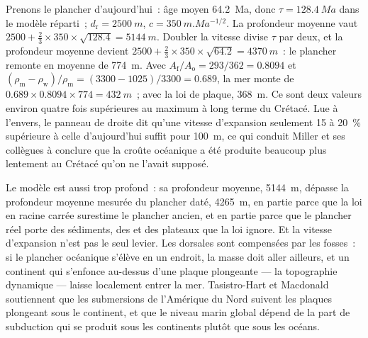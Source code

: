 \begin{example}\label{ex:b2:phanerozoic-earth:doubling}
Prenons le plancher d'aujourd'hui~: âge moyen \qty{64.2}{Ma}, donc $\tau = \qty{128.4}{Ma}$ dans le modèle réparti~;
$d_{\text{r}} = \qty{2500}{m}$, $c = \qty{350}{m.Ma^{-1/2}}$. La profondeur moyenne vaut $2500 + \tfrac23
\times 350 \times \sqrt{128.4} = \qty{5144}{m}$. Doubler la vitesse divise $\tau$ par deux, et la profondeur
moyenne devient $2500 + \tfrac23 \times 350 \times \sqrt{64.2} = \qty{4370}{m}$~: le plancher remonte en moyenne
de \qty{774}{m}. Avec $A_{\text{f}}/A_{\text{o}} = 293/362 = 0.8094$ et
$(\rho_{\text{m}} - \rho_{\text{w}})/\rho_{\text{m}} = (3300 - 1025)/3300 = 0.689$, la mer monte de
$0.689 \times 0.8094 \times 774 = \qty{432}{m}$~; avec la loi de plaque, \qty{368}{m}. Ce sont deux valeurs
environ quatre fois supérieures au maximum à long terme du Crétacé. Lue à l'envers, le panneau de droite dit
qu'une vitesse d'expansion seulement 15 à \qty{20}{\percent} supérieure à celle d'aujourd'hui suffit pour \qty{100}{m}, ce qui
conduit Miller et ses collègues à conclure que la croûte océanique a été produite beaucoup plus lentement
au Crétacé qu'on ne l'avait supposé.
\end{example}

Le modèle est aussi trop profond~: sa profondeur moyenne, \qty{5144}{m}, dépasse la profondeur moyenne mesurée du
plancher daté, \qty{4265}{m}, en partie parce que la loi en racine carrée surestime le plancher ancien, et en
partie parce que le plancher réel porte des sédiments, des  et des plateaux que la loi ignore.
Et la vitesse d'expansion n'est pas le seul levier. Les dorsales sont compensées par les fosses~: si le plancher
océanique s'élève en un endroit, la masse doit aller ailleurs, et un continent qui s'enfonce au-dessus d'une
plaque plongeante --- la topographie dynamique --- laisse localement entrer la mer. Tasistro-Hart et Macdonald
soutiennent que les submersions de l'Amérique du Nord suivent les plaques plongeant sous le continent, et que le
niveau marin global dépend de la part de subduction qui se produit sous les continents plutôt que sous les océans.


